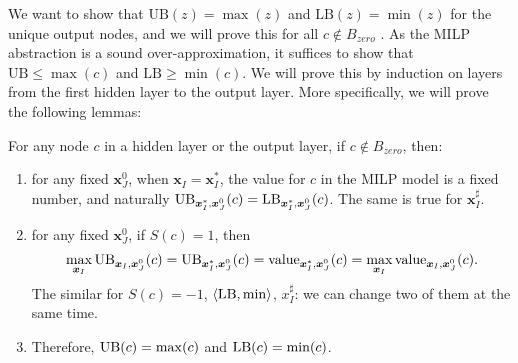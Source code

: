 			
			We want to show that $\mathrm{UB}(z) = \max (z)$ and $\mathrm{LB}(z) = \min (z)$ for the unique output nodes, and we will prove this for all $c\notin B_{zero}$ . As the MILP abstraction is a sound over-approximation, 
			it suffices to show that $\mathrm{UB}\leq \max (c)$ and $\mathrm{LB} \geq \min (c)$. We will prove this by induction on layers from the first hidden layer to the output layer. More specifically, we will prove the following lemmas:
			
			
			\begin{lemma} \label{lem:main}
				For any node $c$ in a hidden layer or the output layer, if $c\notin B_{zero}$, then:		\begin{enumerate}
					\item for any fixed $\boldsymbol{x}^0_J$, when  $\boldsymbol{x}_I=\boldsymbol{x}^*_I$, the value for $c$ in the MILP model is a fixed number, and naturally $\mathrm{UB}_{\boldsymbol{x}^*_I,\boldsymbol{x}^0_J}(c)=\mathrm{LB}_{\boldsymbol{x}^*_I,\boldsymbol{x}^0_J}(c)$. The same is true for $\boldsymbol{x}^\sharp_I$.
					
					\item for any fixed $\boldsymbol{x}^0_J$, if $S(c)=1$, then $$\max_{\boldsymbol{x}_I} \mathrm{UB}_{\boldsymbol{x}_I,\boldsymbol{x}^0_J}(c)=\mathrm{UB}_{\boldsymbol{x}^*_I,\boldsymbol{x}^0_J}(c)= {\textrm{value}}_{\boldsymbol{x}^*_I,\boldsymbol{x}^0_J}(c) = \max_{\boldsymbol{x}_I} {\textrm{value}}_{\boldsymbol{x}_I,\boldsymbol{x}^0_J}(c).$$ The similar for $S(c)=-1$, $\langle \mathrm{LB},\min\rangle$, $x^\sharp_I$: we can change two of them at the same time.
					
					\item Therefore, $\mathrm{UB}(c)=\max(c)$ and $\mathrm{LB}(c)=\min(c)$.
				\end{enumerate}
				
				
				
			\end{lemma}
			
